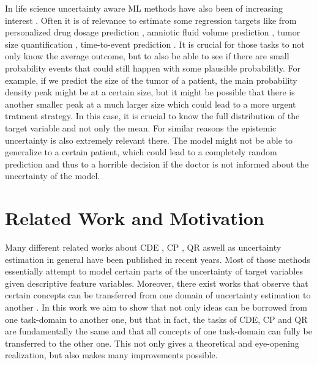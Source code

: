In life science uncertainty aware ML methods have also been of increasing interest \cite{loftus2022uncertainty, lambert2024trustworthy}. Often it is of relevance to estimate some regression targets like from personalized drug dosage prediction \cite{wu2023application}, amniotic fluid volume prediction \cite{csillag2023amnioml}, tumor size quantification \cite{prasad2023tumor}, time-to-event prediction \cite{kvamme2019time, sloma2021empirical}. It is crucial for those tasks to not only know the average outcome, but to also be able to see if there are small probability events that could still happen with some plausible probabilitly. For example, if we predict the size of the tumor of a patient, the main probability density peak might be at a certain size, but it might be possible that there is another smaller peak at a much larger size which could lead to a more urgent tratment strategy. In this case, it is crucial to know the full distribution of the target variable and not only the mean. For similar reasons the epistemic uncertainty is also extremely relevant there. The model might not be able to generalize to a certain patient, which could lead to a completely random prediction and thus to a horrible decision if the doctor is not informed about the uncertainty of the model.

\section{Related Work and Motivation}\label{sec:motivation}

Many different related works about CDE \cite{bishop1994mixture, rothfuss2019conditional, trippe2018conditional, rothfuss2019noise, ambrogioni2017kernel}, CP \cite{izbicki2022cd, chernozhukov2021distributional,romano2019conformalized, Papadopoulos08, angelopoulos2021gentle}, QR \cite{chung2020beyond} aswell as uncertainty estimation in general \cite{gal_dropout_2016, hullermeier_aleatoric_2021, abdar2021review, klotz2021uncertainty} have been published in recent years. Most of those methods essentially attempt to model certain parts of the uncertainty of target variables given descriptive feature variables. Moreover, there exist works that observe that certain concepts can be transferred from one domain of uncertainty estimation to another \cite{chernozhukov2021distributional}. In this work we aim to show that not only ideas can be borrowed from one task-domain to another one, but that in fact, the tasks of CDE, CP and QR are fundamentally the same and that all concepts of one task-domain can fully be transferred to the other one. This not only gives a theoretical and eye-opening realization, but also makes many improvements possible.

